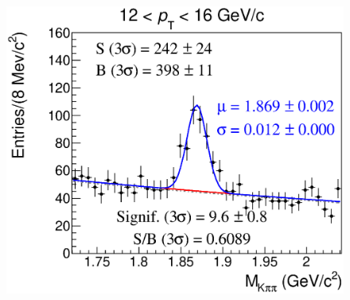 \documentclass[b5paper,10pt,twoside,oldstyle,classica]{toptesi}
\begin{document}
\begin{figure}[h]
\begin{center}
{\includegraphics[scale = 0.25]{MassFitSet2_Pt6.eps}}
\end{center}
\end{figure}
\clearpage
\end{document}
